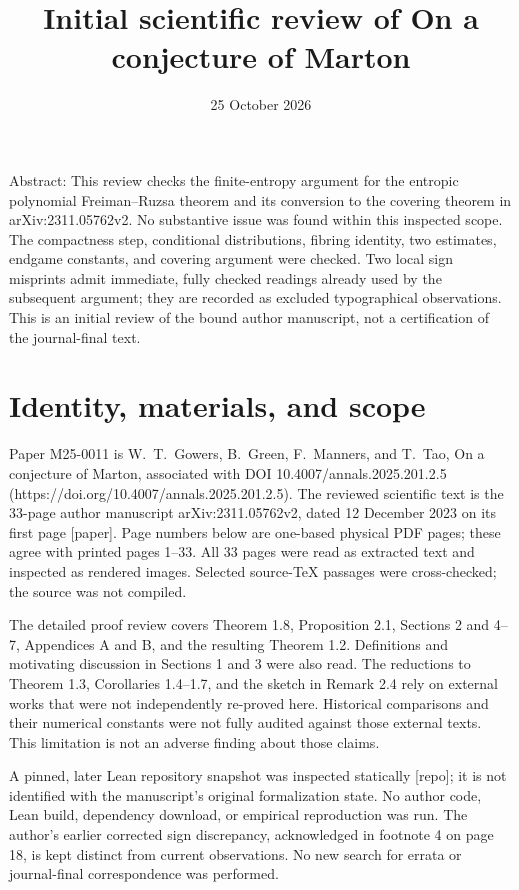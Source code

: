 \documentclass[10pt]{article}
\title{Initial scientific review of On a conjecture of Marton}
\author{}
\date{25 October 2026}
\begin{document}
\maketitle
Abstract: This review checks the finite-entropy argument for the entropic polynomial Freiman–Ruzsa theorem and its conversion to the covering theorem in arXiv:2311.05762v2. No substantive issue was found within this inspected scope. The compactness step, conditional distributions, fibring identity, two estimates, endgame constants, and covering argument were checked. Two local sign misprints admit immediate, fully checked readings already used by the subsequent argument; they are recorded as excluded typographical observations. This is an initial review of the bound author manuscript, not a certification of the journal-final text.\par
\section*{Identity, materials, and scope}
Paper M25-0011 is W. T. Gowers, B. Green, F. Manners, and T. Tao, On a conjecture of Marton, associated with DOI 10.4007/annals.2025.201.2.5 (https://doi.org/10.4007/annals.2025.201.2.5). The reviewed scientific text is the 33-page author manuscript arXiv:2311.05762v2, dated 12 December 2023 on its first page [paper]. Page numbers below are one-based physical PDF pages; these agree with printed pages 1–33. All 33 pages were read as extracted text and inspected as rendered images. Selected source-TeX passages were cross-checked; the source was not compiled.\par
The detailed proof review covers Theorem 1.8, Proposition 2.1, Sections 2 and 4–7, Appendices A and B, and the resulting Theorem 1.2. Definitions and motivating discussion in Sections 1 and 3 were also read. The reductions to Theorem 1.3, Corollaries 1.4–1.7, and the sketch in Remark 2.4 rely on external works that were not independently re-proved here. Historical comparisons and their numerical constants were not fully audited against those external texts. This limitation is not an adverse finding about those claims.\par
A pinned, later Lean repository snapshot was inspected statically [repo]; it is not identified with the manuscript’s original formalization state. No author code, Lean build, dependency download, or empirical reproduction was run. The author’s earlier corrected sign discrepancy, acknowledged in footnote 4 on page 18, is kept distinct from current observations. No new search for errata or journal-final correspondence was performed.\par
\end{document}
